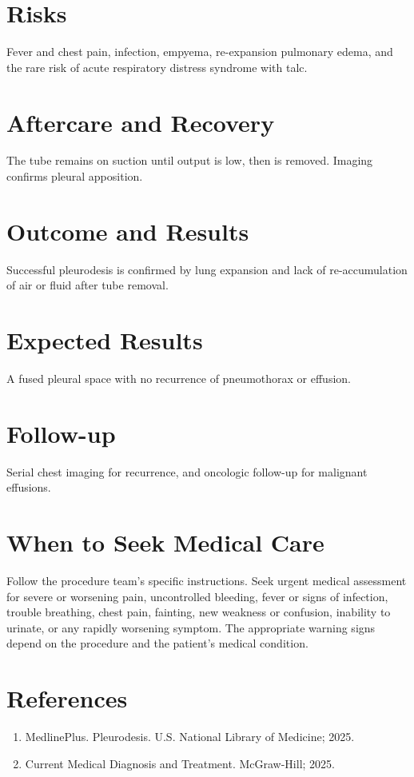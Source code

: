 \section*{Risks}
Fever and chest pain, infection, empyema, re-expansion pulmonary edema, and the rare risk of acute respiratory distress syndrome with talc.

\section*{Aftercare and Recovery}
The tube remains on suction until output is low, then is removed. Imaging confirms pleural apposition.

\section*{Outcome and Results}
Successful pleurodesis is confirmed by lung expansion and lack of re-accumulation of air or fluid after tube removal.

\section*{Expected Results}
A fused pleural space with no recurrence of pneumothorax or effusion.

\section*{Follow-up}
Serial chest imaging for recurrence, and oncologic follow-up for malignant effusions.

\section*{When to Seek Medical Care}
Follow the procedure team's specific instructions. Seek urgent medical assessment for severe or worsening pain, uncontrolled bleeding, fever or signs of infection, trouble breathing, chest pain, fainting, new weakness or confusion, inability to urinate, or any rapidly worsening symptom. The appropriate warning signs depend on the procedure and the patient's medical condition.

\section*{References}
\begin{enumerate}
  \item MedlinePlus. Pleurodesis. U.S. National Library of Medicine; 2025.
  \item Current Medical Diagnosis and Treatment. McGraw-Hill; 2025.
\end{enumerate}

\clearpage

